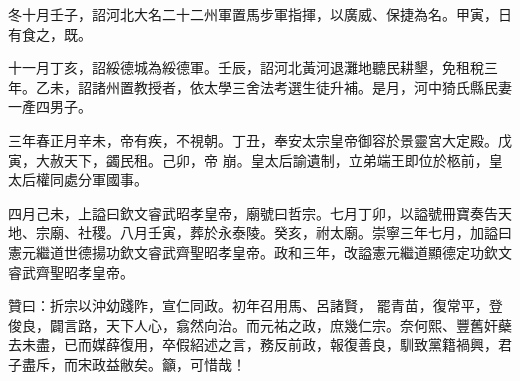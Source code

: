 \begin{pinyinscope}
 冬十月壬子，詔河北大名二十二州軍置馬步軍指揮，以廣威、保捷為名。甲寅，日有食之，既。



 十一月丁亥，詔綏德城為綏德軍。壬辰，詔河北黃河退灘地聽民耕墾，免租稅三年。乙未，詔諸州置教授者，依太學三舍法考選生徒升補。是月，河中猗氏縣民妻一產四男子。



 三年春正月辛未，帝有疾，不視朝。丁丑，奉安太宗皇帝御容於景靈宮大定殿。戊寅，大赦天下，蠲民租。己卯，帝
 崩。皇太后諭遺制，立弟端王即位於柩前，皇太后權同處分軍國事。



 四月己未，上謚曰欽文睿武昭孝皇帝，廟號曰哲宗。七月丁卯，以謚號冊寶奏告天地、宗廟、社稷。八月壬寅，葬於永泰陵。癸亥，祔太廟。崇寧三年七月，加謚曰憲元繼道世德揚功欽文睿武齊聖昭孝皇帝。政和三年，改謚憲元繼道顯德定功欽文睿武齊聖昭孝皇帝。



 贊曰：折宗以沖幼踐阼，宣仁同政。初年召用馬、呂諸賢，
 罷青苗，復常平，登俊良，闢言路，天下人心，翕然向治。而元祐之政，庶幾仁宗。奈何熙、豐舊奸蘗去未盡，已而媒薛復用，卒假紹述之言，務反前政，報復善良，馴致黨籍禍興，君子盡斥，而宋政益敝矣。籲，可惜哉！



\end{pinyinscope}